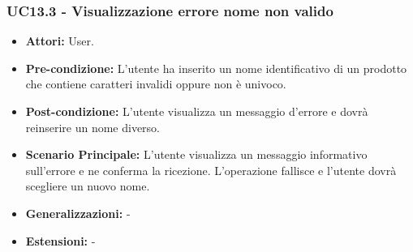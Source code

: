 \subsubsection{UC13.3 - Visualizzazione errore nome non valido}
\begin{itemize}
    \item \textbf{Attori:} User.
    \item \textbf{Pre-condizione:}  L'utente ha inserito un nome identificativo di un prodotto che contiene caratteri invalidi oppure non è univoco.
    \item \textbf{Post-condizione:}  L'utente visualizza un messaggio d'errore e dovrà reinserire un nome diverso.
    \item \textbf{Scenario Principale:}  L'utente visualizza un messaggio informativo sull'errore e ne conferma la ricezione. L'operazione fallisce e l'utente dovrà scegliere un nuovo nome.
    \item \textbf{Generalizzazioni:} -
    \item \textbf{Estensioni:} -
\end{itemize}